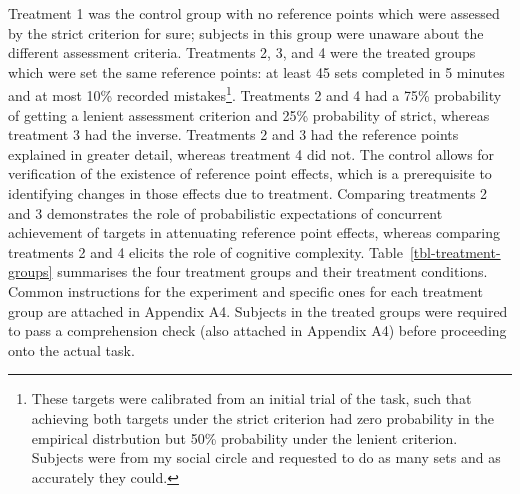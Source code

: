 \documentclass[
  12,
  letterpaper,
  DIV=11,
  numbers=noendperiod]{scrartcl}
\begin{document}
Treatment 1 was the control group with no reference points which were
assessed by the strict criterion for sure; subjects in this group were
unaware about the different assessment criteria. Treatments 2, 3, and 4
were the treated groups which were set the same reference points: at
least 45 sets completed in 5 minutes and at most 10\% recorded
mistakes\footnote{These targets were calibrated from an initial trial of
  the task, such that achieving both targets under the strict criterion
  had zero probability in the empirical distrbution but 50\% probability
  under the lenient criterion. Subjects were from my social circle and
  requested to do as many sets and as accurately they could.}.
Treatments 2 and 4 had a 75\% probability of getting a lenient
assessment criterion and 25\% probability of strict, whereas treatment 3
had the inverse. Treatments 2 and 3 had the reference points explained
in greater detail, whereas treatment 4 did not. The control allows for
verification of the existence of reference point effects, which is a
prerequisite to identifying changes in those effects due to treatment.
Comparing treatments 2 and 3 demonstrates the role of probabilistic
expectations of concurrent achievement of targets in attenuating
reference point effects, whereas comparing treatments 2 and 4 elicits
the role of cognitive complexity. Table~\ref{tbl-treatment-groups}
summarises the four treatment groups and their treatment conditions.
Common instructions for the experiment and specific ones for each
treatment group are attached in Appendix A4. Subjects in the treated
groups were required to pass a comprehension check (also attached in
Appendix A4) before proceeding onto the actual task.

\bigskip
\end{document}
